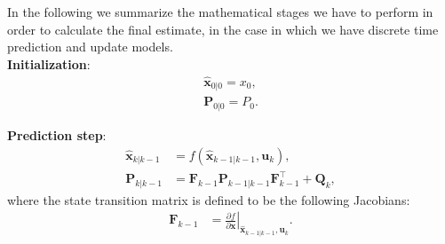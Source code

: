 In the following we summarize the mathematical stages we have to perform in order to calculate the final estimate, in the case in which we have discrete time prediction and update models.\\

\textbf{Initialization}:
\begin{subequations}
\begin{align}
\boldsymbol{\hat{x}}_{0|0} = x_0 ,  \\[10pt]
\boldsymbol{P}_{0|0} = P_0 .
\end{align}
\end{subequations}

\textbf{Prediction step}:
\begin{subequations}
\begin{align}
\boldsymbol{\hat{x}}_{k|k-1} &= f(\boldsymbol{\hat{x}}_{k-1|k-1},\boldsymbol{u}_k), \\[10pt]
\boldsymbol{P}_{k|k-1} &= \boldsymbol{F}_{k-1} \boldsymbol{P}_{k-1|k-1}\boldsymbol{F}_{k-1}^{\top } + \boldsymbol{Q}_{k},
\end{align}
\end{subequations}
where the state transition matrix is defined to be the following Jacobians:
\begin{align}
\boldsymbol{F}_{k-1}&= \left.{\frac{\partial f}{\partial {\boldsymbol{x}}}} \right \vert_{\hat{\boldsymbol{x}}_{k-1|k-1},\boldsymbol{u}_{k}}.
\end{align}

